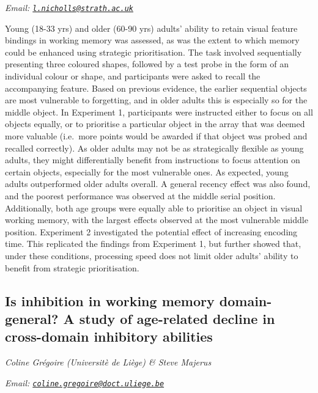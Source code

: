 \documentclass[
  12pt,
]{book}
\begin{document}
\emph{Email: \href{mailto:l.nicholls@strath.ac.uk}{\nolinkurl{l.nicholls@strath.ac.uk}}}

Young (18-33 yrs) and older (60-90 yrs) adults' ability to retain visual feature bindings in working memory was assessed, as was the extent to which memory could be enhanced using strategic prioritisation. The task involved sequentially presenting three coloured shapes, followed by a test probe in the form of an individual colour or shape, and participants were asked to recall the accompanying feature. Based on previous evidence, the earlier sequential objects are most vulnerable to forgetting, and in older adults this is especially so for the middle object. In Experiment 1, participants were instructed either to focus on all objects equally, or to prioritise a particular object in the array that was deemed more valuable (i.e.~more points would be awarded if that object was probed and recalled correctly). As older adults may not be as strategically flexible as young adults, they might differentially benefit from instructions to focus attention on certain objects, especially for the most vulnerable ones. As expected, young adults outperformed older adults overall. A general recency effect was also found, and the poorest performance was observed at the middle serial position. Additionally, both age groups were equally able to prioritise an object in visual working memory, with the largest effects observed at the most vulnerable middle position. Experiment 2 investigated the potential effect of increasing encoding time. This replicated the findings from Experiment 1, but further showed that, under these conditions, processing speed does not limit older adults' ability to benefit from strategic prioritisation.

\hypertarget{is-inhibition-in-working-memory-domain-general-a-study-of-age-related-decline-in-cross-domain-inhibitory-abilities}{%
\subsection{Is inhibition in working memory domain-general? A study of age-related decline in cross-domain inhibitory abilities}\label{is-inhibition-in-working-memory-domain-general-a-study-of-age-related-decline-in-cross-domain-inhibitory-abilities}}

\emph{Coline Grégoire (Universitè de Liège) \& Steve Majerus}

\emph{Email: \href{mailto:coline.gregoire@doct.uliege.be}{\nolinkurl{coline.gregoire@doct.uliege.be}}}
\end{document}
